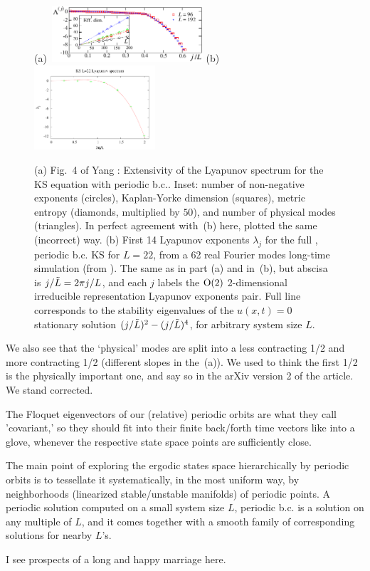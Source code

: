 \begin{description}
\begin{figure}
 (a)~\includegraphics[width=0.50\textwidth]{../figs/YaTaGiChRa08fig4}
 (b)~\includegraphics[width=0.40\textwidth]{../figs/lyapSpecRscld}
\caption{
(a)
Fig.~4 of
Yang \etal{}:
Extensivity of the Lyapunov spectrum for the KS equation with
periodic b.c.. Inset: number of non-negative exponents (circles),
Kaplan-Yorke dimension (squares), metric entropy (diamonds,
multiplied by $50$), and number of physical modes (triangles).
In perfect agreement with
\,(b) here, plotted the same
(incorrect) way.
(b)
First 14 Lyapunov exponents $\lambda_j$ for the full
\statesp, periodic b.c. KS for $L=22$, from a 62 real Fourier
modes long-time simulation (from ).
The same as in part (a) and in \,(b), but
abscisa is $j/\tilde{L} = 2 \pi j/L$, and each $j$ labels
the $\textrm{O}(2)$ 2-dimensional irreducible representation
Lyapunov exponents pair.  Full line corresponds to
the stability eigenvalues
of the $u(x,t)=0$ stationary solution
$(j/\tilde{L})^2- (j/\tilde{L})^4$, for arbitrary system size $L$.
}
\label{fig:lyapSpecRscld}
\end{figure}


We also see
that the `physical' modes are split into a less contracting 1/2
and more contracting 1/2 (different slopes in the
\,(a)). We
used to think the first 1/2 is the physically important one,
and say so in the arXiv version 2 of the article.
We stand corrected.

The Floquet eigenvectors of our (relative) periodic orbits are
what they call 'covariant,' so they should fit into their finite back/forth
time vectors like into a glove, whenever the respective state space
points are sufficiently close.

The main point of exploring the ergodic states space hierarchically
by periodic orbits is to tessellate it systematically, in the most
uniform way, by neighborhoods (linearized stable/unstable manifolds)
of periodic points. A periodic solution computed on a small system
size $L$, periodic b.c. is a solution on any multiple of $L$, and it comes
together with a smooth family of corresponding solutions for nearby
$L$'s.

I see prospects of a long and happy marriage here.

\end{description}

